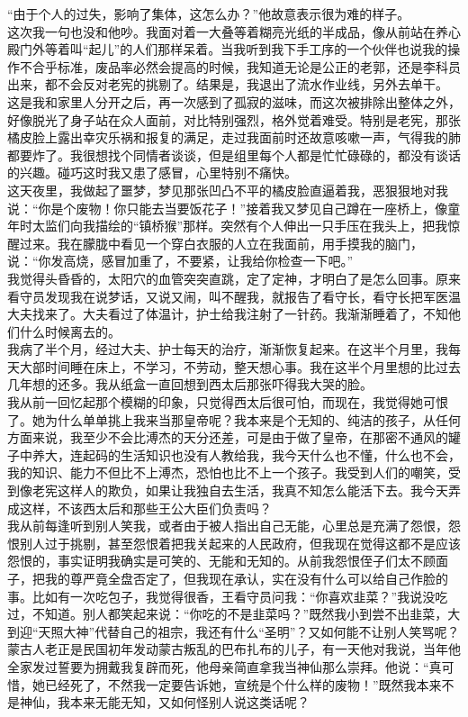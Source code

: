 “由于个人的过失，影响了集体，这怎么办？”他故意表示很为难的样子。\\

这次我一句也没和他吵。我面对着一大叠等着糊亮光纸的半成品，像从前站在养心殿门外等着叫“起儿”的人们那样呆着。当我听到我下手工序的一个伙伴也说我的操作不合乎标准，废品率必然会提高的时候，我知道无论是公正的老郭，还是李科员出来，都不会反对老宪的挑剔了。结果是，我退出了流水作业线，另外去单干。\\

这是我和家里人分开之后，再一次感到了孤寂的滋味，而这次被排除出整体之外，好像脱光了身子站在众人面前，对比特别强烈，格外觉着难受。特别是老宪，那张橘皮脸上露出幸灾乐祸和报复的满足，走过我面前时还故意咳嗽一声，气得我的肺都要炸了。我很想找个同情者谈谈，但是组里每个人都是忙忙碌碌的，都没有谈话的兴趣。碰巧这时我又患了感冒，心里特别不痛快。\\

这天夜里，我做起了噩梦，梦见那张凹凸不平的橘皮脸直逼着我，恶狠狠地对我说：“你是个废物！你只能去当要饭花子！”接着我又梦见自己蹲在一座桥上，像童年时太监们向我描绘的“镇桥猴”那样。突然有个人伸出一只手压在我头上，把我惊醒过来。我在朦胧中看见一个穿白衣服的人立在我面前，用手摸我的脑门，说：“你发高烧，感冒加重了，不要紧，让我给你检查一下吧。”\\

我觉得头昏昏的，太阳穴的血管突突直跳，定了定神，才明白了是怎么回事。原来看守员发现我在说梦话，又说又闹，叫不醒我，就报告了看守长，看守长把军医温大夫找来了。大夫看过了体温计，护士给我注射了一针药。我渐渐睡着了，不知他们什么时候离去的。\\

我病了半个月，经过大夫、护士每天的治疗，渐渐恢复起来。在这半个月里，我每天大部时间睡在床上，不学习，不劳动，整天想心事。我在这半个月里想的比过去几年想的还多。我从纸盒一直回想到西太后那张吓得我大哭的脸。\\

我从前一回忆起那个模糊的印象，只觉得西太后很可怕，而现在，我觉得她可恨了。她为什么单单挑上我来当那皇帝呢？我本来是个无知的、纯洁的孩子，从任何方面来说，我至少不会比溥杰的天分还差，可是由于做了皇帝，在那密不通风的罐子中养大，连起码的生活知识也没有人教给我，我今天什么也不懂，什么也不会，我的知识、能力不但比不上溥杰，恐怕也比不上一个孩子。我受到人们的嘲笑，受到像老宪这样人的欺负，如果让我独自去生活，我真不知怎么能活下去。我今天弄成这样，不该西太后和那些王公大臣们负责吗？\\

我从前每逢听到别人笑我，或者由于被人指出自己无能，心里总是充满了怨恨，怨恨别人过于挑剔，甚至怨恨着把我关起来的人民政府，但我现在觉得这都不是应该怨恨的，事实证明我确实是可笑的、无能和无知的。从前我怨恨侄子们太不顾面子，把我的尊严竟全盘否定了，但我现在承认，实在没有什么可以给自己作脸的事。比如有一次吃包子，我觉得很香，王看守员问我：“你喜欢韭菜？”我说没吃过，不知道。别人都笑起来说：“你吃的不是韭菜吗？”既然我小到尝不出韭菜，大到迎“天照大神”代替自己的祖宗，我还有什么“圣明”？又如何能不让别人笑骂呢？蒙古人老正是民国初年发动蒙古叛乱的巴布扎布的儿子，有一天他对我说，当年他全家发过誓要为拥戴我复辟而死，他母亲简直拿我当神仙那么崇拜。他说：“真可惜，她已经死了，不然我一定要告诉她，宣统是个什么样的废物！”既然我本来不是神仙，我本来无能无知，又如何怪别人说这类话呢？\\

